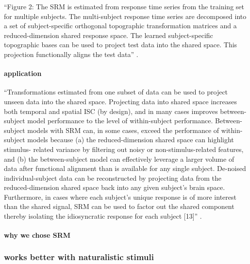 %
``Figure 2: The SRM is estimated from response time series from the training set
for multiple subjects. The multi-subject response time series are decomposed
into a set of subject-specific orthogonal topographic transformation matrices
and a reduced-dimension shared response space. The learned subject-specific
topographic bases can be used to project test data into the shared space. This
projection functionally aligns the test data'' \citep{kumar2020brainiak}.


\paragraph{application}
%
``Transformations estimated from one subset of data can be used to project
unseen data into the shared space. Projecting data into shared space increases
both temporal and spatial ISC (by design), and in many cases improves
between-subject model performance to the level of within-subject performance.
Between-subject models with SRM can, in some cases, exceed the performance of
within-subject models because (a) the reduced-dimension shared space can
highlight stimulus- related variance by filtering out noisy or
non-stimulus-related features, and (b) the between-subject model can effectively
leverage a larger volume of data after functional alignment than is available
for any single subject. De-noised individual-subject data can be reconstructed
by projecting data from the reduced-dimension shared space back into any given
subject’s brain space. Furthermore, in cases where each subject's unique
response is of more interest than the shared signal, SRM can be used to factor
out the shared component thereby isolating the idiosyncratic response for each
subject [13]'' \citep{kumar2020brainiak}.


\paragraph{why we chose SRM}





\subsubsection{works better with naturalistic stimuli}

